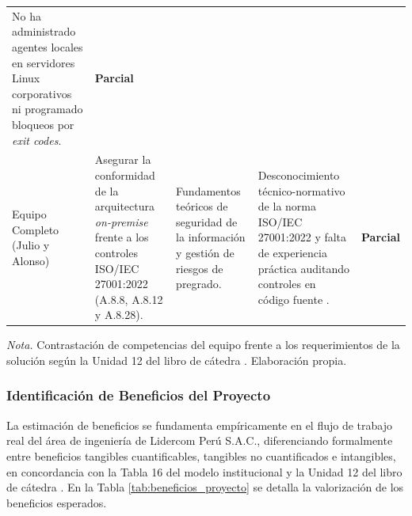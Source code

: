 \begin{table}[H]
\begin{tabularx}{\textwidth}{>{\raggedright\arraybackslash}p{2.3cm} >{\raggedright\arraybackslash}p{3.5cm} >{\raggedright\arraybackslash}p{3.2cm} >{\raggedright\arraybackslash}X >{\centering\arraybackslash}p{1.6cm}}
No ha administrado agentes locales en servidores Linux corporativos ni programado bloqueos por \textit{exit codes}. & 
\textbf{Parcial} \\
\addlinespace
Equipo Completo \newline (Julio y Alonso) & 
Asegurar la conformidad de la arquitectura \textit{on-premise} frente a los controles ISO/IEC 27001:2022 (A.8.8, A.8.12 y A.8.28). & 
Fundamentos teóricos de seguridad de la información y gestión de riesgos de pregrado. & 
Desconocimiento técnico-normativo de la norma ISO/IEC 27001:2022 y falta de experiencia práctica auditando controles en código fuente \parencite{gutierrez2024auditoria}. & 
\textbf{Parcial} \\
\bottomrule
\end{tabularx}
\vspace{2pt}
\begin{flushleft}
\scriptsize \textit{Nota.} Contrastación de competencias del equipo frente a los requerimientos de la solución según la Unidad 12 del libro de cátedra \parencite{torres2026proyecto}. Elaboración propia. %
\end{flushleft}
\end{table}

\subsubsection{Identificación de Beneficios del Proyecto}
La estimación de beneficios se fundamenta empíricamente en el flujo de trabajo real del área de ingeniería de Lidercom Perú S.A.C., diferenciando formalmente entre beneficios tangibles cuantificables, tangibles no cuantificados e intangibles, en concordancia con la Tabla 16 del modelo institucional y la Unidad 12 del libro de cátedra \parencite{torres2026proyecto}. %
En la Tabla \ref{tab:beneficios_proyecto} se detalla la valorización de los beneficios esperados. %

